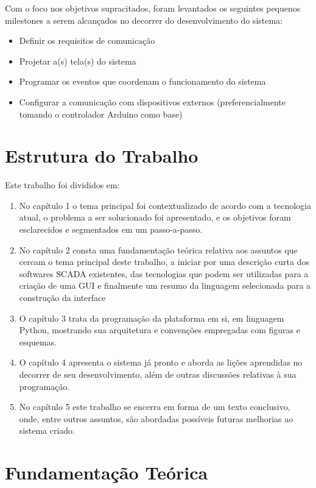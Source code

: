 Com o foco nos objetivos supracitados, foram levantados os seguintes pequenos milestones a serem alcançados no decorrer do desenvolvimento do sistema:

\begin{itemize}
	\item Definir os requisitos de comunicação
	\item Projetar a(s) tela(s) do sistema
	\item Programar os eventos que coordenam o funcionamento do sistema
	\item Configurar a comunicação com dispositivos externos (preferencialmente tomando o controlador Arduino como base)
\end{itemize}

\section{Estrutura do Trabalho}

Este trabalho foi divididos em:

\begin{enumerate}
	\item No capítulo 1 o tema principal foi contextualizado de acordo com a tecnologia atual, o problema a ser solucionado foi apresentado, e os objetivos foram esclarecidos e segmentados em um passo-a-passo.
	\item No capítulo 2 consta uma fundamentação teórica relativa aos assuntos que cercam o tema principal deste trabalho, a iniciar por uma descrição curta dos softwares SCADA existentes, das tecnologias que podem ser utilizadas para a criação de uma GUI e finalmente um resumo da linguagem selecionada para a construção da interface
	\item O capítulo 3 trata da programação da plataforma em si, em linguagem Python, mostrando sua arquitetura e convenções empregadas com figuras e esquemas.
	\item O capítulo 4 apresenta o sistema já pronto e aborda as lições aprendidas no decorrer de seu desenvolvimento, além de outras discussões relativas à sua programação.
	\item No capítulo 5 este trabalho se encerra em forma de um texto conclusivo, onde, entre outros assuntos, são abordadas possíveis futuras melhorias ao sistema criado.
\end{enumerate}

\section{Fundamentação Teórica}

